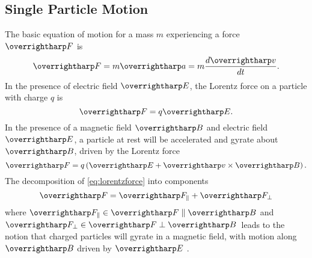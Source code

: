 
\FloatBarrier
\subsection{Single Particle Motion}
The basic equation of motion for a mass $m$ experiencing a force $\vect{F}$ is
\begin{equation}\label{eq:Feqma}
\vect{F}=m\vect{a} = m \frac{d\vect{v}}{dt}.
\end{equation}
In the presence of electric field $\vect{E}$, the Lorentz force on a particle with charge $q$ is
\begin{equation}\label{eq:lorentzforceBeq0}
\vect{F} = q\vect{E}.
\end{equation}
In the presence of a magnetic field $\vect{B}$ and electric field $\vect{E}$, a particle at rest will be accelerated and gyrate about $\vect{B}$, driven by the Lorentz force
\begin{equation}\label{eq:lorentzforce}
\vect{F} = q\left(\vect{E} + \vect{v}\times\vect{B}\right).
\end{equation}
The decomposition of \eqref{eq:lorentzforce} into components
\begin{equation}\label{eq:Fperppar}
\vect{F} = \vect{F}_\parallel + \vect{F}_\perp
\end{equation}
where $\vect{F}_\parallel\in \vect{F} \parallel \vect{B}$ and $\vect{F}_\perp \in \vect{F} \perp \vect{B}$\ leads  to the notion that charged particles will gyrate in a magnetic field, with motion along $\vect{B}$ driven by $\vect{E}$ \citep{cravensbook}. 

